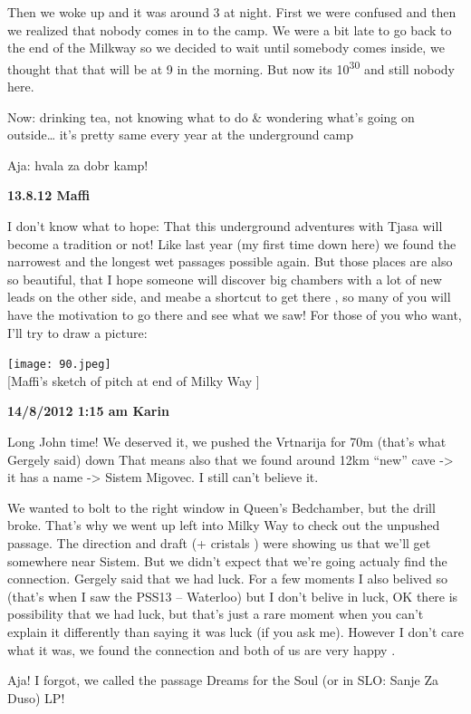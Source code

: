 Then we woke up and it was around 3 at night. First we were confused and
then we realized that nobody comes in to the camp. We were a bit late to
go back to the end of the Milkway so we decided to wait until somebody
comes inside, we thought that that will be at 9 in the morning. But now
its 10\textsuperscript{30} and still nobody here.

Now: drinking tea, not knowing what to do \& wondering what's going on
outside\ldots{} it's pretty same every year at the underground camp

Aja: hvala za dobr kamp!

\textbf{13.8.12 Maffi}

I don't know what to hope: That this underground adventures with Tjasa
will become a tradition or not! Like last year (my first time down here)
we found the narrowest and the longest wet passages possible again. But
those places are also so beautiful, that I hope someone will discover
big chambers with a lot of new leads on the other side, and meabe a
shortcut to get there , so many of you will have the motivation to go
there and see what we saw! For those of you who want, I'll try to draw a
picture:

\texttt{[image: 90.jpeg]}\\
{[}Maffi's sketch of pitch at end of Milky Way {]}

\textbf{14/8/2012 1:15 am Karin}

Long John time! We deserved it, we pushed the Vrtnarija for 70m (that's
what Gergely said) down That means also that we found around 12km
``new'' cave -\textgreater{} it has a name -\textgreater{} Sistem
Migovec. I still can't believe it.

We wanted to bolt to the right window in Queen's Bedchamber, but the
drill broke. That's why we went up left into Milky Way to check out the
unpushed passage. The direction and draft (+ cristals ) were showing us
that we'll get somewhere near Sistem. But we didn't expect that we're
going actualy find the connection. Gergely said that we had luck. For a
few moments I also belived so (that's when I saw the PSS13 -- Waterloo)
but I don't belive in luck, OK there is possibility that we had luck,
but that's just a rare moment when you can't explain it differently than
saying it was luck (if you ask me). However I don't care what it was, we
found the connection and both of us are very happy .

Aja! I forgot, we called the passage Dreams for the Soul (or in SLO:
Sanje Za Duso) LP!

